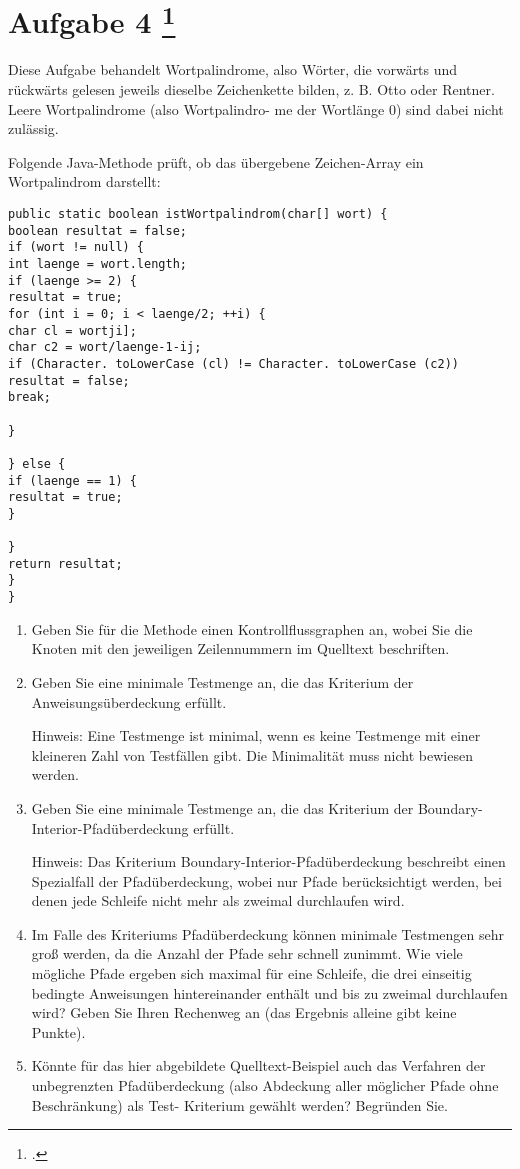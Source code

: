 \documentclass{lehramt-informatik-aufgabe}
\begin{document}
\section{Aufgabe 4
\footcite{66116:2020:09}}

Diese Aufgabe behandelt Wortpalindrome, also Wörter, die vorwärts und
rückwärts gelesen jeweils dieselbe Zeichenkette bilden, z. B. Otto oder
Rentner. Leere Wortpalindrome (also Wortpalindro- me der Wortlänge 0)
sind dabei nicht zulässig.

Folgende Java-Methode prüft, ob das übergebene Zeichen-Array ein
Wortpalindrom darstellt:

\begin{verbatim}
public static boolean istWortpalindrom(char[] wort) {
boolean resultat = false;
if (wort != null) {
int laenge = wort.length;
if (laenge >= 2) {
resultat = true;
for (int i = 0; i < laenge/2; ++i) {
char cl = wortji];
char c2 = wort/laenge-1-ij;
if (Character. toLowerCase (cl) != Character. toLowerCase (c2))
resultat = false;
break;

}

} else {
if (laenge == 1) {
resultat = true;
}

}
return resultat;
}
}
\end{verbatim}
\begin{enumerate}

\item Geben Sie für die Methode einen Kontrollflussgraphen an, wobei Sie
die Knoten mit den jeweiligen Zeilennummern im Quelltext beschriften.

\item Geben Sie eine minimale Testmenge an, die das Kriterium der
Anweisungsüberdeckung erfüllt.

Hinweis: Eine Testmenge ist minimal, wenn es keine Testmenge mit einer
kleineren Zahl von Testfällen gibt. Die Minimalität muss nicht bewiesen
werden.

\item Geben Sie eine minimale Testmenge an, die das Kriterium der
Boundary-Interior-Pfadüberdeckung erfüllt.

Hinweis: Das Kriterium Boundary-Interior-Pfadüberdeckung beschreibt
einen Spezialfall der Pfadüberdeckung, wobei nur Pfade berücksichtigt
werden, bei denen jede Schleife nicht mehr als zweimal durchlaufen wird.

\item Im Falle des Kriteriums Pfadüberdeckung können minimale Testmengen
sehr groß werden, da die Anzahl der Pfade sehr schnell zunimmt. Wie
viele mögliche Pfade ergeben sich maximal für eine Schleife, die drei
einseitig bedingte Anweisungen hintereinander enthält und bis zu zweimal
durchlaufen wird? Geben Sie Ihren Rechenweg an (das Ergebnis alleine
gibt keine Punkte).

\item Könnte für das hier abgebildete Quelltext-Beispiel auch das
Verfahren der unbegrenzten Pfadüberdeckung (also Abdeckung aller
möglicher Pfade ohne Beschränkung) als Test- Kriterium gewählt werden?
Begründen Sie.

\end{enumerate}
\end{document}
